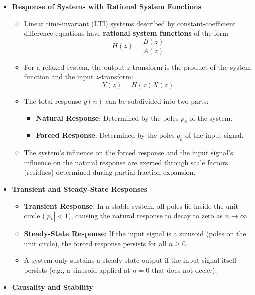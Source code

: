 \begin{itemize}
\item
  \textbf{Response of Systems with Rational System Functions}

  \begin{itemize}
  \tightlist
  \item
    Linear time-invariant (LTI) systems described by
    constant-coefficient difference equations have \textbf{rational
    system functions} of the form \[H(z) = \frac{B(z)}{A(z)}\]
  \item
    For a relaxed system, the output \(z\)-transform is the product of
    the system function and the input \(z\)-transform:
    \[Y(z) = H(z)X(z)\]
  \item
    The total response \(y(n)\) can be subdivided into two parts:

    \begin{itemize}
    \tightlist
    \item
      \textbf{Natural Response}: Determined by the poles \({p_k}\) of
      the system.
    \item
      \textbf{Forced Response}: Determined by the poles \({q_k}\) of the
      input signal.
    \end{itemize}
  \item
    The system's influence on the forced response and the input signal's
    influence on the natural response are exerted through scale factors
    (residues) determined during partial-fraction expansion.
  \end{itemize}
\item
  \textbf{Transient and Steady-State Responses}

  \begin{itemize}
  \tightlist
  \item
    \textbf{Transient Response}: In a stable system, all poles lie
    inside the unit circle (\(|p_k| < 1\)), causing the natural response
    to decay to zero as \(n \to \infty\).
  \item
    \textbf{Steady-State Response}: If the input signal is a sinusoid
    (poles on the unit circle), the forced response persists for all
    \(n \ge 0\).
  \item
    A system only sustains a steady-state output if the input signal
    itself persists (e.g., a sinusoid applied at \(n=0\) that does not
    decay).
  \end{itemize}
\item
  \textbf{Causality and Stability}


\end{itemize}
